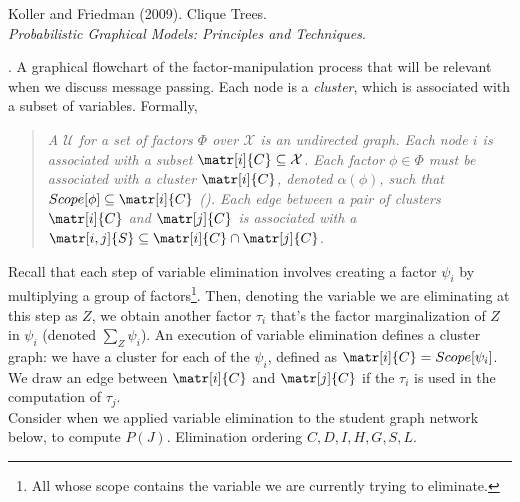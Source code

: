 \documentclass[11pt]{article}
\newcommand\p{\Needspace{10\baselineskip} \noindent}
\begin{document}
\clearpage
\vspace{-1.7em}
{\scriptsize Koller and Friedman (2009). Clique Trees.\\ \textit{Probabilistic Graphical Models: Principles and Techniques}.\\ }

\p {}. A graphical flowchart of the factor-manipulation process that will be relevant when we discuss message passing. Each node is a \textit{cluster}, which is associated with a subset of variables. Formally,
\vspace{-0.7em}
\begin{quote}
	{\itshape A  $\mathcal{U}$ for a set of factors $\Phi$ over $\mathcal X$ is an undirected graph. Each node $i$ is associated with a subset $\matr[i]{C} \subseteq \mathcal X$. Each factor $\phi \in \Phi$ must be associated with a cluster $\matr[i]{C}$, denoted $\alpha(\phi)$, such that $Scope[\phi] \subseteq \matr[i]{C}$ (). Each edge between a pair of clusters $\matr[i]{C}$ and $\matr[j]{C}$ is associated with a  $\matr[i,j]{S} \subseteq \matr[i]{C} \cap \matr[j]{C}$.  }
\end{quote}
Recall that each step of variable elimination involves creating a factor $\psi_i$ by multiplying a group of factors\footnote{All whose scope contains the variable we are currently trying to eliminate.}. Then, denoting the variable we are eliminating at this step as $Z$, we obtain another factor $\tau_i$ that's the factor marginalization of $Z$ in $\psi_i$ (denoted $\sum_Z \psi_i$). An execution of variable elimination defines a cluster graph: we have a cluster for each of the $\psi_i$, defined as $\matr[i]{C} = Scope[\psi_i]$. We draw an edge between $\matr[i]{C}$ and $\matr[j]{C}$ if the  $\tau_i$ is used in the computation of $\tau_j$. \\

Consider when we applied variable elimination to the student graph network below, to compute $P(J)$. Elimination ordering $C,D,I,H,G,S,L$.
\end{document}
